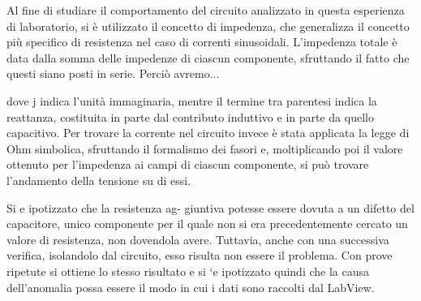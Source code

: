 Al fine di studiare il comportamento del circuito analizzato in questa esperienza di laboratorio, si è utilizzato il concetto di impedenza, che generalizza il concetto più specifico di resistenza nel caso di correnti sinusoidali.
L’impedenza totale è data dalla somma delle impedenze di ciascun componente, sfruttando il fatto che questi siano posti in serie. Perciò avremo...


dove j indica l’unità immaginaria, mentre il termine tra parentesi indica la reattanza, costituita in parte dal contributo induttivo e in parte da quello capacitivo.
Per trovare la corrente nel circuito invece è stata applicata la legge di Ohm simbolica, sfruttando il formalismo dei fasori e, moltiplicando poi il valore ottenuto per l’impedenza ai campi di ciascun componente, si può trovare l’andamento della tensione su di essi.

Si e ipotizzato che la resistenza ag- giuntiva potesse essere dovuta a un difetto del capacitore, unico componente per
il quale non si era precedentemente cercato un valore di resistenza, non dovendola avere. Tuttavia, anche con una successiva
verifica, isolandolo dal circuito, esso risulta non essere il problema. Con prove ripetute si ottiene lo stesso risultato e si
`e ipotizzato quindi che la causa dell’anomalia possa essere il modo in cui i dati sono raccolti dal LabView.